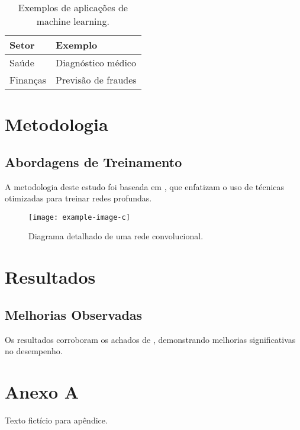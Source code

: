 	\begin{table}[ht]
		\centering
		\begin{tabular}{|l|l|}
			\hline
			\textbf{Setor} & \textbf{Exemplo} \\ \hline
			Saúde & Diagnóstico médico \\ \hline
			Finanças & Previsão de fraudes \\ \hline
		\end{tabular}
		\caption{Exemplos de aplicações de machine learning.}
		\label{tab:aplicacoes}
	\end{table}
	
	\chapter{Metodologia}
	\section{Abordagens de Treinamento}
	A metodologia deste estudo foi baseada em \citet{smith2021optimization}, que enfatizam o uso de técnicas otimizadas para treinar redes profundas.
	
	\begin{figure}[ht]
		\centering
		\texttt{[image: example-image-c]}
		\caption{Diagrama detalhado de uma rede convolucional.}
		\label{fig:rede-convolucional}
	\end{figure}
	
	\chapter{Resultados}
	\section{Melhorias Observadas}
	Os resultados corroboram os achados de \citet{smith2021optimization}, demonstrando melhorias significativas no desempenho.
	
	\clearpage
	\pagestyle{plain}
	
	
	
	\appendix
	\chapter{Anexo A}
	Texto fictício para apêndice.
	\lipsum[10]
	

